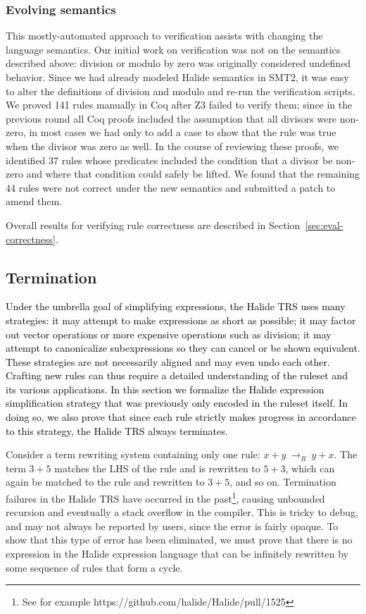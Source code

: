 \documentclass[acmsmall]{acmart}\settopmatter{}
\newcommand{\modified}[1]{\textcolor{black}{{#1}}}
\newcommand{\rewrites}[0]{\:\rightarrow_{R}\:}
\newcommand{\NumZdivCoqProvedRules}{{\color{black} 141}\xspace}
\newcommand{\NumZdivFalseRules}{{\color{black} 44}\xspace}
\newcommand{\NumZdivRelaxedPredicates}{{\color{black} 37}\xspace}
\begin{document}
\subsubsection{Evolving semantics}
\label{sub:evolvingsemantics}

This mostly-automated approach to verification assists with changing
the language semantics. Our initial work on verification was not on
the semantics described above: division or modulo by zero was originally
considered undefined behavior. Since we had already
modeled Halide semantics in SMT2, it was easy to alter the
definitions of division and modulo and re-run the verification scripts.
We proved \NumZdivCoqProvedRules rules manually in Coq after Z3 failed to verify them; 
since in the previous round all Coq proofs
included the assumption that all divisors were non-zero, in most cases
we had only to add a case to show that the rule was true when the
divisor was zero as well. In the course of reviewing
these proofs, we identified \NumZdivRelaxedPredicates rules whose
predicates included the condition that a divisor be non-zero and where
that condition could safely be lifted. We found that the remaining
\NumZdivFalseRules rules were not correct under the new semantics and
submitted a patch to amend them.

Overall results for verifying rule correctness are described in Section~\ref{sec:eval-correctness}.

\subsection{Termination}
\label{sec:termination}

\modified{Under the umbrella goal of simplifying expressions, the Halide TRS uses
many strategies: it may attempt to make expressions as short as possible; it may factor out
vector operations or more expensive operations such as division; it may attempt to
canonicalize subexpressions so they can cancel or be shown equivalent. These
strategies are not necessarily aligned and may even undo each other. Crafting new rules 
can thus require a detailed understanding of the ruleset and its various applications. 
In this section we formalize the Halide expression simplification strategy that was
previously only encoded in the ruleset itself. In doing so, we also prove that since 
each rule strictly makes progress in accordance to this strategy, the Halide TRS always terminates.}

Consider a term
rewriting system containing only one rule: $x + y \rewrites y + x$. The term
$3 + 5$ matches the LHS of the rule and is rewritten to $5 + 3$, which can again
be matched to the rule and rewritten to $3 + 5$, and so on. Termination failures in the Halide TRS have occurred in the past\footnote{See for example https://github.com/halide/Halide/pull/1525}, causing unbounded recursion and eventually a stack overflow in the compiler. This is tricky to debug, and may not always be reported by users, since the error is fairly opaque. To show that this type of error has been eliminated, we must prove that there is no expression in the Halide expression language that can be infinitely rewritten by some sequence of rules that form a cycle.
\end{document}
